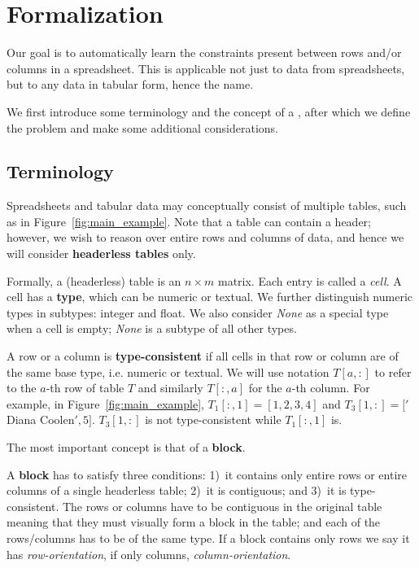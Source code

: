 \section{Formalization}\label{sec:formalization}
Our goal is to automatically learn the constraints present between rows and/or columns in a spreadsheet. This is applicable not just to data from spreadsheets, but to any data in tabular form, hence the name.


We first introduce some terminology and the concept of a \template, after which we define the problem and make some additional considerations.

\subsection{Terminology}
Spreadsheets and tabular data may conceptually consist of multiple tables, such as in Figure~\ref{fig:main_example}. Note that a table can contain a header; however, we wish to reason over entire rows and columns of data, and hence we will consider \textbf{headerless tables} only.

Formally, a (headerless) table is an $n \times m$ matrix. Each entry is called a \textit{cell}.
A cell has a {\bf type}, which can be numeric or textual. We further distinguish numeric types in subtypes: integer and float. We also consider \textit{None} as a special type when a cell is empty; \textit{None} is a subtype of all other types.

A row or a column is \textbf{type-consistent} if all cells in that row or column are of the same base type, i.e. numeric or textual.
We will use notation $T[a,{:}]$ to refer to the $a$-th row of table $T$ and similarly $T[{:},a]$ for the $a$-th column.
For example, in Figure~\ref{fig:main_example}, $T_1[:,1] = [1,2,3,4]$ and $T_3[1,:] = ['$Diana Coolen$', 5]$.
$T_3[1, :]$ is not type-consistent while $T_1[:, 1]$ is.

The most important concept is that of a \textbf{block}. 
\begin{definition}
A \textbf{block} has to satisfy three conditions: 1)~it contains only entire rows or entire columns of a single headerless table; 2)~it is contiguous; and 3)~it is type-consistent.
The rows or columns have to be contiguous in the original table meaning that they must visually form a block in the table; and each of the rows/columns has to be of the same type. 
If a block contains only rows we say it has \textit{row-orientation}, if only columns, \textit{column-orientation}. 
\end{definition}

